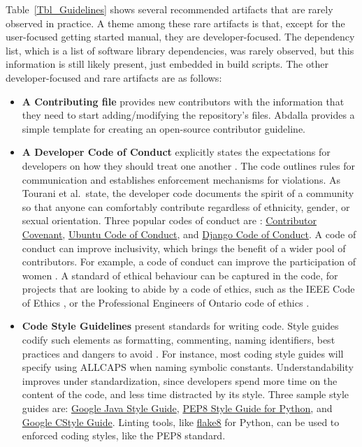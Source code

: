 \documentclass[11pt]{article}
\newcommand{\CC}{C\nolinebreak\hspace{-.05em}\raisebox{.4ex}{\small\bf
+}\nolinebreak\hspace{-.10em}\raisebox{.4ex}{\small\bf +}}
\begin{document}
Table~\ref{Tbl_Guidelines} shows several recommended artifacts that are rarely
observed in practice.  A theme among these rare artifacts is that, except for
the user-focused getting started manual, they are developer-focused.  The
dependency list, which is a list of software library dependencies, was rarely
observed, but this information is still likely present, just embedded in build
scripts. The other developer-focused and rare artifacts are as follows:

\begin{itemize}

\item \textbf{A Contributing file} provides new contributors with the
information that they need to start adding/modifying the repository's files.
Abdalla \cite{Abdalla2016} provides a simple template for creating an
open-source contributor guideline. 

\item \textbf{A Developer Code of Conduct} explicitly states the expectations
for developers on how they should treat one another \cite{TouraniEtAl2017}. The
code outlines rules for communication and establishes enforcement mechanisms for
violations.  As Tourani et al.\ state, the developer code documents the spirit
of a community so that anyone can comfortably contribute regardless of
ethnicity, gender, or sexual orientation. Three popular codes of conduct are
\cite{TouraniEtAl2017}:
\href{https://www.contributor-covenant.org/version/2/1/code_of_conduct/}
{Contributor Covenant}, \href{https://ubuntu.com/community/code-of-conduct}
{Ubuntu Code of Conduct}, and \href{https://www.djangoproject.com/conduct/}
{Django Code of Conduct}. A code of conduct can improve inclusivity, which
brings the benefit of a wider pool of contributors.  For example, a code of
conduct can improve the participation of women \cite{SinghEtAl2021}. A standard
of ethical behaviour can be captured in the code, for projects that are looking
to abide by a code of ethics, such as the IEEE Code of Ethics \cite{IEEE1999},
or the Professional Engineers of Ontario code of ethics \cite[p.\
23--24]{PEO2021}.

\item \textbf{Code Style Guidelines} present standards for writing code. Style
guides codify such elements as formatting, commenting, naming identifiers, best
practices and dangers to avoid \cite{Carty2020}. For instance, most coding
style guides will specify using ALLCAPS when naming symbolic constants.
Understandability improves under standardization, since developers spend
more time on the content of the code, and less time distracted by its style.
Three sample style guides are:
\href{https://google.github.io/styleguide/javaguide.html} {Google Java Style
Guide},
\href{http://cnl.sogang.ac.kr/cnlab/lectures/programming/python/PEP8_Style_Guide.pdf}
{PEP8 Style Guide for Python}, and
\href{https://google.github.io/styleguide/cppguide.html} {Google \CC Style
Guide}.  Linting tools, like \href{https://pypi.org/project/flake8/}{flake8} for
Python, can be used to enforced coding styles, like the PEP8 standard.


\end{itemize}
\end{document}
